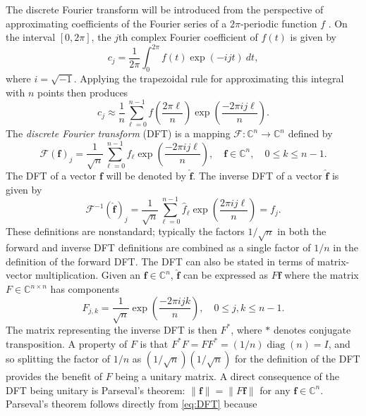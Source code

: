 \documentclass[12pt,notitlepage]{report}
\newcommand{\ctrans}{*}	%
\DeclareMathOperator{\diag}{diag}	%
\begin{document}
The discrete Fourier transform will be introduced from the perspective of approximating coefficients of the Fourier series of a $2\pi$-periodic function $f$ \cite[p.~132-134]{BoggessNarcowich2009}. On the interval $[0,2\pi]$, the $j$th complex Fourier coefficient of $f(t)$ is given by
\[c_j = \frac{1}{2\pi}\int_0^{2\pi} f(t)\exp(-ijt)\:dt,\]
where $i = \sqrt{-1}$.  Applying the trapezoidal rule for approximating this integral with $n$ points then produces
\[c_j \approx \frac{1}{n}\sum_{\ell = 0}^{n-1} f\left(\frac{2\pi{\ell}}{n}\right)\exp\left(\frac{-2\pi{ij\ell}}{n}\right).\]
The \textit{discrete Fourier transform} (DFT) is a mapping $\mathcal{F}:\mathbb{C}^n \rightarrow \mathbb{C}^n$ defined by
\begin{equation}
\mathcal{F}(\mathbf{f})_j = \frac{1}{\sqrt{n}}\sum_{\ell=0}^{n-1} f_{\ell}\exp\left(\frac{-2\pi{ij\ell}}{n}\right), \quad \mathbf{f}\in\mathbb{C}^n, \quad 0 \leq k \leq n-1.
\label{eq:DFT}
\end{equation}
The DFT of a vector $\mathbf{f}$ will be denoted by $\widehat{\mathbf{f}}$. The inverse DFT of a vector $\widehat{\mathbf{f}}$ is given by
\begin{equation}
\mathcal{F}^{-1}(\widehat{\mathbf{f}})_j = \frac{1}{\sqrt{n}}\sum_{\ell=0}^{n-1} \widehat{f}_\ell\exp\left(\frac{2\pi{ij\ell}}{n}\right) = f_j.
\end{equation}
These definitions are nonstandard; typically the factors $1/\sqrt{n}$ in both the forward and inverse DFT definitions are combined as a single factor of $1/n$ in the definition of the forward DFT. The DFT can also be stated in terms of matrix-vector multiplication. Given an $\mathbf{f} \in \mathbb{C}^n$, $\widehat{\mathbf{f}}$ can be expressed as $F\mathbf{f}$ where the matrix $F\in\mathbb{C}^{n\times{n}}$ has components
\begin{equation}
F_{j,k} = \frac{1}{\sqrt{n}}\exp\left(\frac{-2\pi{ijk}}{n}\right), \quad 0 \leq j,k \leq n-1.
\label{eq:DFT-Matrix}
\end{equation}
The matrix representing the inverse DFT is then $F^\ctrans$, where $\ctrans$ denotes conjugate transposition. A property of $F$ is that $F^\ctrans F = FF^\ctrans = (1/n)\diag(n) = I$, and so splitting the factor of $1/n$ as $(1/\sqrt{n})(1/\sqrt{n})$ for the definition of the DFT provides the benefit of $F$ being a unitary matrix. A direct consequence of the DFT being unitary is Parseval's theorem: $\|\mathbf{f}\| = \|F\mathbf{f}\|$ for any $\mathbf{f} \in \mathbb{C}^n$. Parseval's theorem follows directly from \eqref{eq:DFT} because
\end{document}
